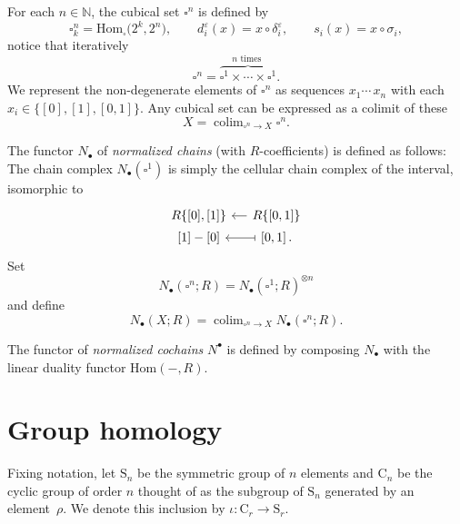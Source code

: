 \documentclass[A4]{amsart}
\theoremstyle{definition}
\newcommand{\Hom}{\mathrm{Hom}}
\DeclareMathOperator*{\colim}{colim}
\begin{document}
For each $n \in \mathbb{N}$, the cubical set $\square^n$ is defined by
\begin{equation*}
\square^n_k  = \Hom_{\square} \big( 2^k, 2^n \big), \qquad 
d^\varepsilon_i(x) = x \circ \delta^\varepsilon_i, \qquad 
s_i(x) = x \circ \sigma_i,
\end{equation*}
notice that iteratively
\begin{equation*}
\square^n = \overbrace{\square^1 \times \cdots \times \square^1}^{n \text{ times }}.
\end{equation*}
We represent the non-degenerate elements of $\square^n$ as sequences $x_1 \cdots\, x_n$ with each $x_i \in \{[0], [1], [0,1]\}$. Any cubical set can be expressed as a colimit of these
\begin{equation*}
X = \colim_{\square^n \to X} \square^n.
\end{equation*}

The functor $N_\bullet$ of \textit{normalized chains} (with $R$-coefficients) is defined as follows: The chain complex $N_\bullet(\square^1)$ is simply the cellular chain complex of the interval,
isomorphic to
\begin{equation*}
\begin{tikzcd} [column sep = small, row sep = 0.1pt]
R\{[0], [1]\}  & \arrow[l] R\{[0,1]\} \\
{[1] - [0]} & \arrow[l, |->] \left[0,1\right].
\end{tikzcd}
\end{equation*}
Set
\begin{equation} \label{eq: chains on I^n}
N_\bullet(\square^n; R) = N_\bullet(\square^1; R)^{\otimes n}
\end{equation}
and define
\begin{equation*}
N_\bullet(X; R) = \colim_{\square^n \to X} N_\bullet(\square^n; R).
\end{equation*}

The functor of \textit{normalized cochains} $N^\bullet$ is defined by composing $N_\bullet$ with the linear duality functor $\Hom(-, R)$.

\section{Group homology}
\label{sec: goup homology}

Fixing notation, let $\mathrm{S}_n$ be the symmetric group of $n$ elements and $\mathrm{C}_n$ be the cyclic group of order $n$ thought of as the subgroup of $\mathrm{S}_n$ generated by an element~$\rho$. We denote this inclusion by $\iota : \mathrm C_r \to \mathrm S_r$.
\end{document}
